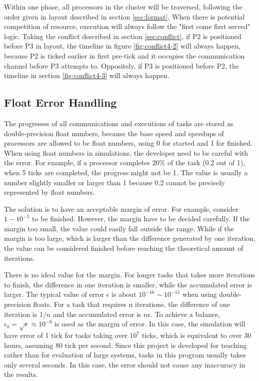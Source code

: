 \documentclass[msc,deptreport, cs]{infthesis}
\begin{document}
Within one phase, all processors in the cluster will be traversed, following the order given in layout described in section \ref{sec:format}. When there is potential competition of resource, execution will always follow the "first come first served" logic. Taking the conflict described in section \ref{sec:conflict}, if P2 is positioned before P3 in layout, the timeline in figure \ref{fig:conflict4-2} will always happen, because P2 is ticked earlier in first pre-tick and it occupies the communication channel before P3 attempts to. Oppositely, if P3 is positioned before P2, the timeline in section \ref{fig:conflict4-3} will always happen.

\subsection{Float Error Handling}

The progresses of all communications and executions of tasks are stored as double-precision float numbers, because the base speed and speedups of processors are allowed to be float numbers, using 0 for started and 1 for finished. When using float numbers in simulations, the developer need to be careful with the error. For example, if a processor completes 20\% of the task (0.2 out of 1), when 5 ticks are completed, the progress might not be 1. The value is usually a number slightly smaller or larger than 1 because 0.2 cannot be precisely represented by float numbers.

The solution is to have an acceptable margin of error. For example, consider $1 - 10^{-5}$ to be finished. However, the margin have to be decided carefully. If the margin too small, the value could easily fall outside the range. While if the margin is too large, which is larger than the difference generated by one iteration, the value can be considered finished before reaching the theoretical amount of iterations.

There is no ideal value for the margin. For longer tasks that takes more iterations to finish, the difference in one iteration is smaller, while the accumulated error is larger. The typical value of error $\epsilon$ is about $10^{-16} \sim 10^{-15}$ when using double-precision floats. For a task that requires n iterations, the difference of one iteration is $1/n$ and the accumulated error is $n\epsilon$. To achieve a balance, $\epsilon_0 = \sqrt{\epsilon} \approx 10^{-8}$ is used as the margin of error. In this case, the simulation will have error of 1 tick for tasks taking over $10^7$ ticks, which is equivalent to over 30 hours, assuming 80 tick per second. Since this project is developed for teaching rather than for evaluation of large systems, tasks in this program usually takes only several seconds. In this case, the error should not cause any inaccuracy in the results. 
\end{document}
